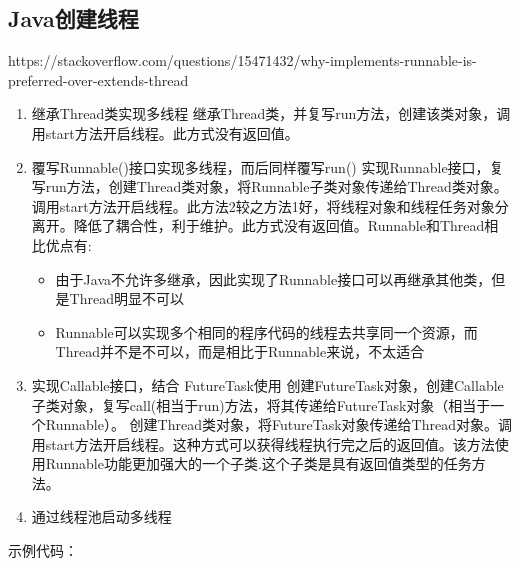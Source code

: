 \documentclass[../../../interview-questions.tex]{subfiles}
\begin{document}
\subsection{Java创建线程}

https://stackoverflow.com/questions/15471432/why-implements-runnable-is-preferred-over-extends-thread

\begin{enumerate}
    \item{继承Thread类实现多线程} 继承Thread类，并复写run方法，创建该类对象，调用start方法开启线程。此方式没有返回值。
    \item{覆写Runnable()接口实现多线程，而后同样覆写run()} 实现Runnable接口，复写run方法，创建Thread类对象，将Runnable子类对象传递给Thread类对象。调用start方法开启线程。此方法2较之方法1好，将线程对象和线程任务对象分离开。降低了耦合性，利于维护。此方式没有返回值。Runnable和Thread相比优点有:
    
    \begin{itemize}
        \item {由于Java不允许多继承，因此实现了Runnable接口可以再继承其他类，但是Thread明显不可以}
        \item {Runnable可以实现多个相同的程序代码的线程去共享同一个资源，而Thread并不是不可以，而是相比于Runnable来说，不太适合}
    \end{itemize}

    \item{实现Callable接口，结合 FutureTask使用} 创建FutureTask对象，创建Callable子类对象，复写call(相当于run)方法，将其传递给FutureTask对象（相当于一个Runnable）。 创建Thread类对象，将FutureTask对象传递给Thread对象。调用start方法开启线程。这种方式可以获得线程执行完之后的返回值。该方法使用Runnable功能更加强大的一个子类.这个子类是具有返回值类型的任务方法。
    \item {通过线程池启动多线程}
\end{enumerate}

示例代码：
\end{document}

